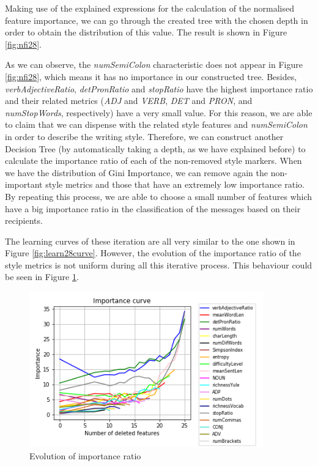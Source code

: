 Making use of the explained expressions for the calculation of the normalised feature importance, we can go through the created tree with the chosen depth in order to obtain the distribution of this value. The result is shown in Figure \ref{fig:nfi28}.

As we can observe, the \textit{numSemiColon} characteristic does not appear in Figure \ref{fig:nfi28}, which means it has no importance in our constructed tree. Besides, \textit{verbAdjectiveRatio}, \textit{detPronRatio} and \textit{stopRatio} have the highest importance ratio and their related metrics (\textit{ADJ} and \textit{VERB}, \textit{DET} and \textit{PRON}, and \textit{numStopWords}, respectively) have a very small value. For this reason, we are able to claim that we can dispense with the related style features and \textit{numSemiColon} in order to describe the writing style. Therefore, we can construct another Decision Tree (by automatically taking a depth, as we have explained before) to calculate the importance ratio of each of the non-removed style markers. When we have the distribution of Gini Importance, we can remove again the non-important style metrics and those that have an extremely low importance ratio. By repeating this process, we are able to choose a small number of features which have a big importance ratio in the classification of the messages based on their recipients.

The learning curves of these iteration are all very similar to the one shown in Figure \ref{fig:learn28curve}. However, the evolution of the importance ratio of the style metrics is not uniform during all this iterative process. This behaviour could be seen in Figure \ref{fig:impcurv}.

\begin{figure}
	\centering%
	\centerline{\includegraphics[width=0.9\textwidth]{Imagenes/Bitmap/DecisionTrees/limportancecurve.png}}%
	\caption{Evolution of importance ratio}%
	\label{fig:impcurv}
\end{figure}

